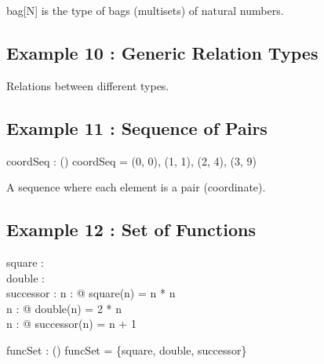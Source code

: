 \documentclass[a4paper,10pt,fleqn]{article}
\begin{document}
\noindent bag[N] is the type of bags (multisets) of natural numbers.

\bigskip

\subsection*{Example 10 : Generic Relation Types}


\noindent Relations between different types.

\bigskip

\subsection*{Example 11 : Sequence of Pairs}

\begin{axdef}
coordSeq : \seq (\nat \cross \nat)
\where
coordSeq = \langle (0, 0), (1, 1), (2, 4), (3, 9) \rangle
\end{axdef}

\noindent A sequence where each element is a pair (coordinate).

\bigskip

\subsection*{Example 12 : Set of Functions}

\begin{axdef}
square : \nat \fun \nat \\
double : \nat \fun \nat \\
successor : \nat \fun \nat
\where
\forall n : \nat @ square(n) = n * n \\
\forall n : \nat @ double(n) = 2 * n \\
\forall n : \nat @ successor(n) = n + 1
\end{axdef}

\begin{axdef}
funcSet : \power (\nat \fun \nat)
\where
funcSet = \{square, double, successor\}
\end{axdef}
\end{document}
